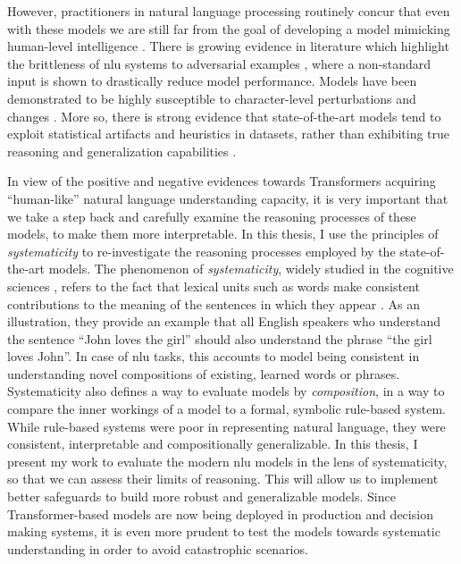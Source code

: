 \documentclass[letterpaper, 12pt]{report}
\begin{document}
However, practitioners in natural language processing routinely concur that even with these models we are still far from the goal of developing a model mimicking human-level intelligence \citep{kiela-etal-2021-dynabench}. There is growing evidence in literature which highlight the brittleness of \acrshort{nlu} systems to adversarial examples \citep{jia-liang-2017-adversarial,ettinger-etal-2017-towards,ettinger-2020-whatbertisnot,ribeiro-etal-2020-beyond}, where a non-standard input is shown to drastically reduce model performance. Models have been demonstrated to be highly susceptible to character-level perturbations and changes \citep{ebrahimi-etal-2018-adversarial,minervini-riedel-2018-adversarially,ebrahimi-etal-2018-hotflip,wallace-etal-2019-universal}.
More so, there is strong evidence that state-of-the-art models tend to exploit statistical artifacts and heuristics in datasets, rather than exhibiting true reasoning and generalization capabilities \citep{gururangan-etal-2018-annotation,poliak-etal-2018-hypothesis,tsuchiya-2018-performance,naik-etal-2018-stress,mccoy2019}.

In view of the positive and negative evidences towards Transformers acquiring ``human-like'' natural language understanding capacity, it is very important that we take a step back and carefully examine the reasoning processes of these models, to make them more interpretable. In this thesis, I use the principles of \textit{systematicity} to re-investigate the reasoning processes employed by the state-of-the-art models.
The phenomenon of \textit{systematicity}, widely studied in the cognitive sciences \citep{gentner1986systematicity}, refers to the fact that lexical units such as words make consistent contributions to the meaning of the sentences in which they appear \citep{fodor1988connectionism}. As an illustration, they provide an example that all English speakers who understand the sentence ``John loves the girl'' should also understand the phrase ``the girl loves John''. In case of \acrshort{nlu} tasks, this accounts to model being consistent in understanding novel compositions of existing, learned words or phrases. Systematicity also defines a way to evaluate models by \textit{composition}, in a way to compare the inner workings of a model to a formal, symbolic rule-based system. While rule-based systems were poor in representing natural language, they were consistent, interpretable and compositionally generalizable. In this thesis, I present my work to evaluate the modern \acrshort{nlu} models in the lens of systematicity, so that we can assess their limits of reasoning. This will allow us to implement better safeguards to build more robust and generalizable models. Since Transformer-based models are now being deployed in production and decision making systems, it is even more prudent to test the models towards systematic understanding in order to avoid catastrophic scenarios.
\end{document}

